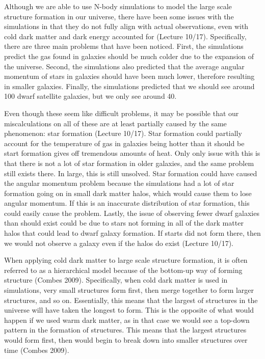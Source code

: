 \documentclass[12pt]{article}
\begin{document}
Although we are able to use N-body simulations to model the large scale
structure formation in our universe, there have been some issues with the
simulations in that they do not fully align with actual observations, even with
cold dark matter and dark energy accounted for (Lecture 10/17).  Specifically,
there are three
main problems that have been noticed.  First, the simulations predict the gas
found in galaxies should be much colder due to the expansion of the universe.
Second, the simulations also predicted that the average angular momentum of
stars in galaxies should have been much lower, therefore resulting in smaller
galaxies.  Finally, the simulations predicted that we should see around 100
dwarf satellite galaxies, but we only see around 40.

Even though these seem like difficult problems, it may be possible that our
miscalculations on all of these are at least partially caused by the same
phenomenon: star formation (Lecture 10/17). Star formation could partially
account for the
temperature of gas in galaxies being hotter than it should be start formation
gives off tremendous amounts of heat.  Only only issue with this is that there
is not a lot of star formation in older galaxies, and the same problem still
exists there.  In large, this is still unsolved.  Star formation could have
caused the angular momentum problem because the simulations had a lot of star
formation going on in small dark matter halos, which would cause them to lose
angular momentum.  If this is an inaccurate distribution of star formation, this
could easily cause the problem.  Lastly, the issue of observing fewer dwarf
galaxies than should exist could be due to stars not forming in all of the dark
matter halos that could lead to dwarf galaxy formation.  If starts did not form
there, then we would not observe a galaxy even if the halos do exist (Lecture
10/17).

When applying cold dark matter to large scale structure formation, it is often
referred to as a hierarchical model because of the bottom-up way of forming
structure (Combes 2009).  Specifically, when cold dark matter is used in simulations,
very small structures form first, then merge together to form larger structures,
and so on.  Essentially, this means that the largest of structures in the
universe will have taken the longest to form.  This is the opposite of what
would happen if we used warm dark matter, as in that case we would see a
top-down pattern in the formation of structures.  This means that the largest
structures would form first, then would begin to break down into smaller
structures over time (Combes 2009).
\end{document}
